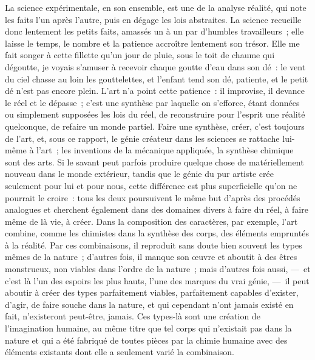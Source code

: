 \documentclass[french,twoside]{book} %
\begin{document}
La science expérimentale, en son ensemble, est une de la analyse réalité, qui note les faits l’un après l’autre, puis en dégage les lois abstraites. La science recueille donc lentement les petits faits, amassés un à un par d’humbles travailleurs ; elle laisse le temps, le nombre et la patience accroître lentement son trésor. Elle me fait songer à cette fillette qu’un jour de pluie, sous le toit de chaume qui dégoutte, je voyais s’amuser à recevoir chaque goutte d’eau dans son dé : le vent du ciel chasse au loin les gouttelettes, et l’enfant tend son dé, patiente, et le petit dé n’est pas encore plein. L’art n’a point cette patience : il improvise, il devance le réel et le dépasse ; c’est une synthèse par laquelle on s’efforce, étant données ou simplement supposées les lois du réel, de reconstruire pour l’esprit une réalité quelconque, de refaire un monde partiel. Faire une synthèse, créer, c’est toujours de l’art, et, sous ce rapport, le génie créateur dans les sciences se rattache lui-même à l’art ; les inventions de la mécanique appliquée, la synthèse chimique sont des arts. Si le savant peut parfois produire quelque chose de matériellement nouveau dans le monde extérieur, tandis que le génie du pur artiste crée seulement pour lui et pour nous, cette différence est plus superficielle qu’on ne pourrait le croire : tous les deux poursuivent le même but d’après des procédés analogues et cherchent également dans des domaines divers à faire du réel, à faire même de là vie, à créer. Dans la composition des caractères, par exemple, l’art combine, comme les chimistes dans la synthèse des corps, des éléments empruntés à la réalité. Par ces combinaisons, il reproduit sans doute bien souvent les types mêmes de la nature ; d’autres fois, il manque son œuvre et aboutit à des êtres monstrueux, non viables dans l’ordre de la nature ; mais d’autres fois aussi, — et c’est là l’un des espoirs les plus hauts, l’une des marques du vrai génie, — il peut aboutir à créer des types parfaitement viables, parfaitement capables d’exister, d’agir, de faire souche dans la nature, et qui cependant n’ont jamais existé en fait, n’existeront peut-être, jamais. Ces types-là sont une création de l’imagination humaine, au même titre que tel corps qui n’existait pas dans la nature et qui a été fabriqué de toutes pièces par la chimie humaine avec des éléments existants dont elle a seulement varié la combinaison.\par
\end{document}
